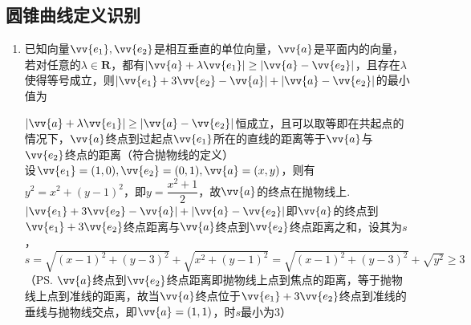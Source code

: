\subsection*{圆锥曲线定义识别}
\begin{enumerate}
    \item 已知向量$\vv{e_1}, \vv{e_2}$是相互垂直的单位向量，$\vv{a}$是平面内的向量，若对任意的$\lambda \in \mathbf{R}$，都有$|\vv{a}+\lambda \vv{e_1}| \geq |\vv{a} - \vv{e_2}|$，且存在$\lambda$使得等号成立，则$|\vv{e_1}+3\vv{e_2}-\vv{a}| + |\vv{a} - \vv{e_2}|$的最小值为
    \begin{jieda}
        $|\vv{a}+\lambda \vv{e_1}| \geq |\vv{a} - \vv{e_2}|$恒成立，且可以取等即在共起点的情况下，$\vv{a}$终点到过起点$\vv{e_1}$所在的直线的距离等于$\vv{a}$与$\vv{e_2}$终点的距离（符合抛物线的定义） \\
        设$\vv{e_1} = (1, 0), \vv{e_2} = (0, 1), \vv{a} = (x, y)$，则有$y^2 = x^2 + (y-1)^2$，即$y = \dfrac{x^2+1}{2}$，故$\vv{a}$的终点在抛物线上. \\
        $|\vv{e_1}+3\vv{e_2}-\vv{a}| + |\vv{a} - \vv{e_2}|$即$\vv{a}$的终点到$\vv{e_1}+3\vv{e_2}$终点距离与$\vv{a}$终点到$\vv{e_2}$终点距离之和，设其为$s$，$s = \sqrt{(x-1)^2+(y-3)^2} + \sqrt{x^2 + (y-1)^2} = \sqrt{(x-1)^2+(y-3)^2}+\sqrt{y^2} \geq 3$
        （\ps $\vv{a}$终点到$\vv{e_2}$终点距离即抛物线上点到焦点的距离，等于抛物线上点到准线的距离，故当$\vv{a}$终点位于$\vv{e_1}+3\vv{e_2}$终点到准线的垂线与抛物线交点，即$\vv{a} = (1,1)$，时$s$最小为3）
    \end{jieda}


\end{enumerate}
